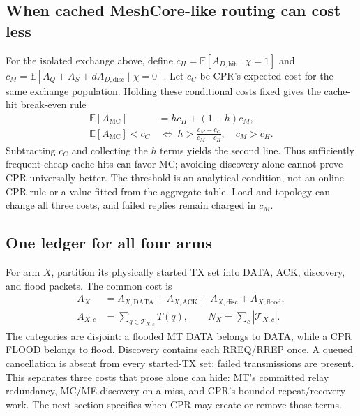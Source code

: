 \documentclass[conference,letterpaper,10pt]{IEEEtran}
\begin{document}
\subsection{When cached MeshCore-like routing can cost less}
For the isolated exchange above, define
$c_H=\mathbb E[A_{D,\mathrm{hit}}\mid\chi=1]$ and
$c_M=\mathbb E[A_Q+A_S+dA_{D,\mathrm{disc}}\mid\chi=0]$.
Let $c_C$ be CPR's expected cost for the same exchange population.
Holding these conditional costs fixed gives the cache-hit break-even rule
\begin{equation}
\begin{aligned}
\mathbb E[A_{\mathrm{MC}}]&=h c_H+(1-h)c_M,\\
\mathbb E[A_{\mathrm{MC}}]<c_C
 &\ \Longleftrightarrow\
 h>\frac{c_M-c_C}{c_M-c_H},\quad c_M>c_H.
\end{aligned}
\label{eq:mc-cache-break-even}
\end{equation}
Subtracting $c_C$ and collecting the $h$ terms yields the second line.
Thus sufficiently frequent cheap cache hits can favor MC; avoiding discovery
alone cannot prove CPR universally better. The threshold is an analytical
condition, not an online CPR rule or a value fitted from the aggregate table.
Load and topology can change all three costs, and failed replies
remain charged in $c_M$.

\subsection{One ledger for all four arms}
For arm $X$, partition its physically started TX set into DATA, ACK, discovery,
and flood packets. The common cost is
\begin{equation}
\begin{aligned}
A_X&=A_{X,\mathrm{DATA}}+A_{X,\mathrm{ACK}}
       +A_{X,\mathrm{disc}}+A_{X,\mathrm{flood}},\\
A_{X,c}&=\sum_{q\in\mathcal T_{X,c}}T(q),\qquad
N_X=\sum_c|\mathcal T_{X,c}|.
\end{aligned}
\label{eq:unified-cost}
\end{equation}
The categories are disjoint: a flooded MT DATA belongs to DATA, while a
CPR FLOOD belongs to flood. Discovery contains each RREQ/RREP once.
A queued cancellation is absent from every started-TX set; failed
transmissions are present. This separates three costs that prose alone can
hide: MT's committed relay redundancy, MC/ME discovery on a miss, and CPR's
bounded repeat/recovery work. The next section specifies when CPR may create
or remove those terms.
\end{document}
